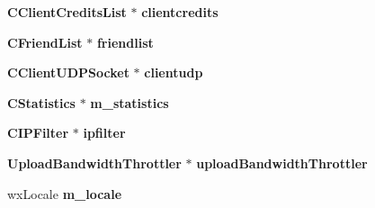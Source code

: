 \begin{DoxyCompactItemize}
\item 
{\bf CClientCreditsList} $\ast$ {\bfseries clientcredits}\label{classCamuleApp_a8e1d9153cd1ea7d9c70365dd55641b6a}

\item 
{\bf CFriendList} $\ast$ {\bfseries friendlist}\label{classCamuleApp_a441d86264e1741b2fea31b1d80024f32}

\item 
{\bf CClientUDPSocket} $\ast$ {\bfseries clientudp}\label{classCamuleApp_a44f89a53a46d6eaf80d097f57b388362}

\item 
{\bf CStatistics} $\ast$ {\bfseries m\_\-statistics}\label{classCamuleApp_a16af2c1f918a53ef62f31c91640f54c7}

\item 
{\bf CIPFilter} $\ast$ {\bfseries ipfilter}\label{classCamuleApp_aeb5b1bbad4b3b7dc897b6f7ff330d9b9}

\item 
{\bf UploadBandwidthThrottler} $\ast$ {\bfseries uploadBandwidthThrottler}\label{classCamuleApp_aa90fbfe0e8d07a259d5b095be09a1430}

\item 
wxLocale {\bfseries m\_\-locale}\label{classCamuleApp_acfd5de07aab3c203771a4fca2a3732b8}

\end{DoxyCompactItemize}

